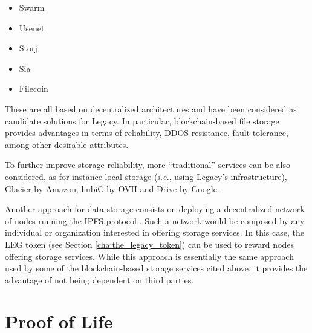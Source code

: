 \begin{itemize}
	\item Swarm
	\item Usenet
	\item Storj
	\item Sia
	\item Filecoin
\end{itemize}

These are all based on decentralized architectures and have been considered as candidate solutions for Legacy.
In particular, blockchain-based file storage provides advantages in terms of reliability, DDOS resistance, fault tolerance, among other desirable attributes. 

To further improve storage reliability, more ``traditional'' services can be also considered, as for instance local storage (\textit{i.e.}, using Legacy's infrastructure), Glacier by Amazon, hubiC by OVH and Drive by Google.

Another approach for data storage consists on deploying a decentralized network of nodes running the IPFS protocol \cite{Benet}. Such a network would be composed by any individual or organization interested in offering storage services. In this case, the LEG token (see Section \ref{cha:the_legacy_token}) can be used to reward nodes offering storage services.
While this approach is essentially the same approach used by some of the blockchain-based storage services cited above, it provides the advantage of not being dependent on third parties.


\section{Proof of Life} %
\label{sec:proof_of_life}

